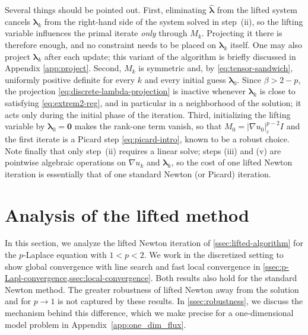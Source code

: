 \documentclass[11pt,pdflatex,sn-mathphys-num]{sn-jnl}
\theoremstyle{thmstyleone}%
\theoremstyle{thmstyletwo}%
\theoremstyle{thmstylethree}%
\newcommand{\bs}[1]{\ensuremath{\boldsymbol{#1}}}
\begin{document}
Several things should be pointed out. First, eliminating $\hat{\bs\lambda}$ from the lifted system cancels $\bs\lambda_k$ from the right-hand side of the system solved in step~(ii), so the lifting variable influences the primal iterate \emph{only} through $M_k$. Projecting it there is therefore enough, and no constraint needs to be placed on $\bs\lambda_k$ itself. One may also project $\bs\lambda_k$ after each update; this variant of the algorithm is briefly discussed in Appendix \ref{app:project}.
Second, $M_k$ is symmetric and, by \eqref{eq:tensor-sandwich}, uniformly positive definite for every $k$ and every initial guess $\bs\lambda_0$. Since $\beta>2-p$, the projection \eqref{eq:discrete-lambda-projection} is inactive whenever $\bs\lambda_k$ is close to satisfying \eqref{eq:extrem2-reg}, and in particular in a neighborhood of the solution; it acts only during the initial phase of the iteration.
Third, initializing the lifting variable by $\bs\lambda_0=\bs 0$ makes the rank-one term vanish, so that $M_0=|\nabla u_0|_\varepsilon^{p-2}I$ and the first iterate is a Picard step \eqref{eq:picard-intro}, known to be a robust choice.
Note finally that only step~(ii) requires a linear solve; steps (iii) and (v) are pointwise algebraic operations on $\nabla u_k$ and $\bs\lambda_k$, so the cost of one lifted Newton iteration is essentially that of one standard Newton (or Picard) iteration.

\section{Analysis of the lifted method}\label{sec:analysis}
In this section, we analyze the lifted Newton iteration of \cref{ssec:lifted-algorithm} for the $p$-Laplace equation with $1<p<2$.
We work in the discretized setting to show global convergence with line search and fast local convergence in \cref{ssec:p-Lapl-convergence,ssec:local-convergence}. Both results also hold for the standard Newton method. The greater robustness of lifted Newton away from the solution and for $p\to 1$ is not captured by these results. In \cref{ssec:robustness}, we discuss the mechanism behind this difference, which we make precise for a one-dimensional model problem in Appendix~\ref{app:one_dim_flux}.
\end{document}
